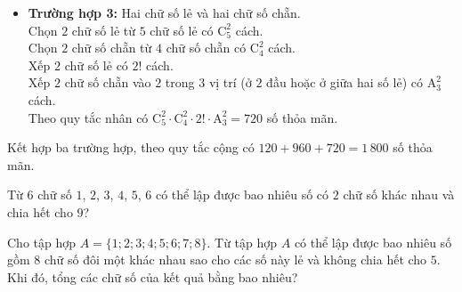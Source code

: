 \begin{ex}
{\begin{itemchoice}
\begin{itemize}
				Chọn $3$ chữ số lẻ từ $5$ chữ số lẻ có  $\mathrm{C}_{5}^{3}$ cách.\\
				Chọn $1$ chữ số chẵn từ $4$ chữ số chẵn có  $\mathrm{C}_{4}^{1}$ cách.\\
				Sắp xếp $4$ chữ số đã chọn  có $4!$ cách.\\
				 Theo quy tắc nhân có $\mathrm{C}_{5}^{3}\cdot\mathrm{C}_{4}^{1}\cdot4!=960$ số thỏa mãn.
				\item \textbf{Trường hợp 3:} Hai  chữ số lẻ và hai chữ số chẵn.\\
				Chọn $2$ chữ số lẻ từ  $5$ chữ số lẻ có $\mathrm{C}_{5}^{2}$ cách.\\
				 Chọn $2$ chữ số chẵn từ $4$ chữ số chẵn có $\mathrm{C}_{4}^{2}$ cách.\\
				Xếp $2$ chữ số lẻ có $2!$ cách.\\ 
				Xếp $2$ chữ số chẵn vào  $2$ trong $3$ vị trí (ở $2$ đầu hoặc ở giữa hai số lẻ) có $\mathrm{A}_{3}^{2}$ cách.\\
				Theo quy  tắc nhân có $\mathrm{C}_{5}^{2}\cdot\mathrm{C}_{4}^{2}\cdot2!\cdot\mathrm{A}_{3}^{2}=720$ số thỏa mãn.
			\end{itemize}
			Kết hợp ba trường hợp, theo quy tắc cộng  có $120+960+720=1\,800$ số thỏa mãn.
		\end{itemchoice}
	 }
\end{ex}


\begin{bt}%
	Từ 6 chữ số $1$, $2$, $3$, $4$, $5$, $6$ có thể  lập được bao nhiêu số có $2$ chữ số khác nhau và chia hết cho $9$?
\end{bt}

\begin{bt}%
	Cho tập hợp $A=\{1;2;3;4;5;6;7;8\}$. Từ tập hợp $A$ có thể lập được bao nhiêu số gồm $8$ chữ số đôi một khác nhau sao cho các số này lẻ và không chia hết cho $5$. Khi đó, tổng các chữ số của kết quả  bằng bao nhiêu?
\end{bt}

